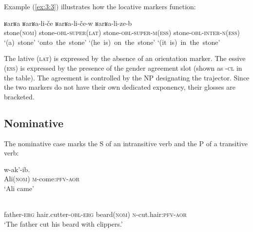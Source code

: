 ﻿\documentclass[output=paper]{langsci/langscibook}
\begin{document}



Example (\ref{ex:3:3}) illustrates how the locative markers function:

\ea \label{ex:3:3}
\glll ʁarʁa ʁarʁa-li-če ʁarʁa-li-če-w ʁarʁa-li-ze-b\\
stone(\textsc{nom}) stone-\textsc{obl}-\textsc{super}(\textsc{lat}) stone-\textsc{obl}-\textsc{super}-\textsc{m}(\textsc{ess}) stone-\textsc{obl}-\textsc{inter}-\textsc{n}(\textsc{ess})\\
`(a)~stone' `onto~the~stone' `(he~is)~on~the~stone' `(it~is)~in~the~stone'\\

\z

The lative (\textsc{lat}) is expressed by the absence of an orientation
marker. The essive (\textsc{ess}) is expressed by the presence of the
gender agreement slot (shown as -\textsc{cl} in the table). The agreement
is controlled by the NP designating the trajector. Since the two markers
do not have their own dedicated exponency, their glosses are bracketed.



\subsection{Nominative}\label{nominative}

The nominative case marks the S of an intransitive verb and the P of a
transitive verb:

\ea
{} w-ak'-ib.\\
Ali(\textsc{nom}) \textsc{m}-come:\textsc{pfv}-\textsc{aor}\\
\glt `Ali came'

\ex
{}\\
father-\textsc{erg} hair.cutter-\textsc{obl}-\textsc{erg} beard(\textsc{nom}) \textsc{n}-cut.hair:\textsc{pfv}-\textsc{aor}\\
\glt `The father cut his beard with clippers.'
\z
\end{document}
